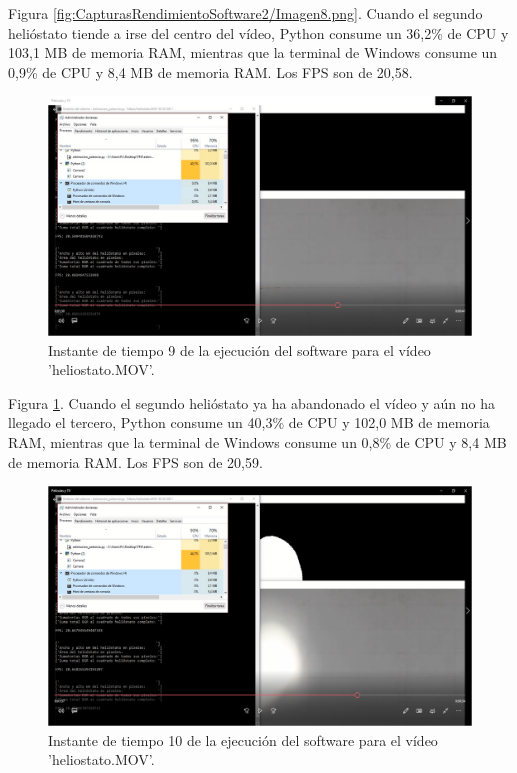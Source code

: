 Figura \ref{fig:CapturasRendimientoSoftware2/Imagen8.png}. Cuando el segundo helióstato tiende a irse del centro del vídeo, Python consume un 36,2\% de CPU y 103,1 MB de memoria RAM, mientras que la terminal de Windows consume un 0,9\% de CPU y 8,4 MB de memoria RAM. Los FPS son de 20,58.

\begin{figure}[h!]
  	\centering
	\includegraphics[width=\textwidth]{CapturasRendimientoSoftware2/Imagen9.png}
	\caption{Instante de tiempo 9 de la ejecución del software para el vídeo 'heliostato.MOV'.
	\label{fig:CapturasRendimientoSoftware2/Imagen9.png}}
\end{figure}

Figura \ref{fig:CapturasRendimientoSoftware2/Imagen9.png}. Cuando el segundo helióstato ya ha abandonado el vídeo y aún no ha llegado el tercero, Python consume un 40,3\% de CPU y 102,0 MB de memoria RAM, mientras que la terminal de Windows consume un 0,8\% de CPU y 8,4 MB de memoria RAM. Los FPS son de 20,59.

\begin{figure}[h!]
  	\centering
	\includegraphics[width=\textwidth]{CapturasRendimientoSoftware2/Imagen10.png}
	\caption{Instante de tiempo 10 de la ejecución del software para el vídeo 'heliostato.MOV'.
	\label{fig:CapturasRendimientoSoftware2/Imagen10.png}}
\end{figure}

